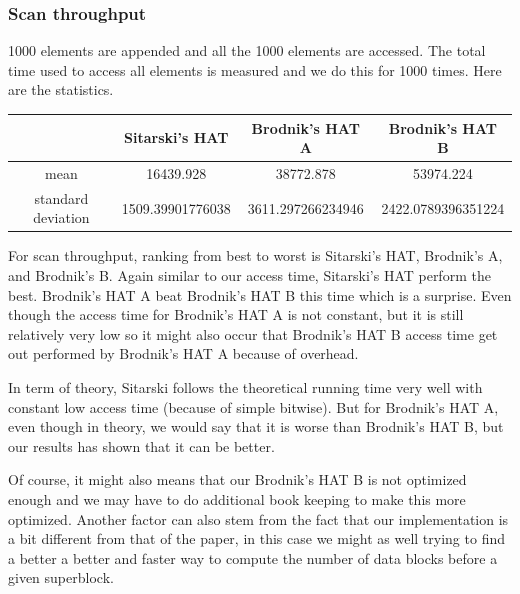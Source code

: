 \documentclass{article} %
\begin{document}
    \subsubsection*{Scan throughput}
    1000 elements are appended and all the 1000 elements are accessed. The total time used to access all elements is measured and we do this for 1000 times.
    Here are the statistics.
    \begin{center}
        \begin{tabular}{|c|c|c|c|}\hline
        & Sitarski's HAT & Brodnik's HAT A & Brodnik's HAT B\\\hline
        mean &  16439.928 & 38772.878 & 53974.224\\\hline
        standard deviation & 1509.39901776038  & 3611.297266234946 & 2422.0789396351224\\\hline
        \end{tabular}
    \end{center}
    For scan throughput, ranking from best to worst is Sitarski's HAT, Brodnik's A, and Brodnik's B.
    Again similar to our access time, Sitarski's HAT perform the best. Brodnik's HAT A beat Brodnik's HAT B this time which is a
    surprise. Even though the access time for Brodnik's HAT A is not constant, but it is still relatively very low
    so it might also occur that Brodnik's HAT B access time get out performed by Brodnik's HAT A because of overhead.

    In term of theory, Sitarski follows the theoretical running time very well with constant low access time (because of simple bitwise).
    But for Brodnik's HAT A, even though in theory, we would say that it is worse than Brodnik's HAT B, but our results has shown that it can be better.

    Of course, it might also means that our Brodnik's HAT B is not optimized enough and we may have to do additional book keeping to make this more optimized.
    Another factor can also stem from the fact that our implementation is a bit different from that of the paper, in this case we might as well trying to find a better
    a better and faster way to compute the number of data blocks before a given superblock.
\end{document}

